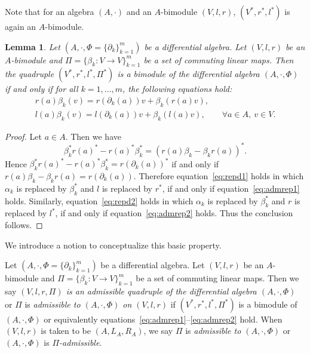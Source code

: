 \documentclass[pdftex]{sigma}
\numberwithin{equation}{section}
\newtheorem{Lemma}[Theorem]{Lemma}
\begin{document}
Note that for an algebra $(A,\cdot)$ and an $A$-bimodule $(V, l, r)$, $(V^*, r^*, l^*)$ is again an $A$-bimodule.

\begin{Lemma}\label{lem:dualrep}
 Let $(A, \cdot, \Phi = \{\partial_k\}_{k=1}^m)$ be a differential algebra.
 Let $(V, l, r)$ be an $A$-bimodule
 and $\Pi = \{\beta_k\colon V \to V\}_{k=1}^m$ be a set of commuting linear maps.
 Then the quadruple $(V^*, r^*, l^*, \Pi^*)$ is a bimodule of the differential algebra $(A, \cdot, \Phi)$ if and only if for all $k=1, \dots,
 m$, the following equations hold:
 \begin{gather}
 r(a) \beta_k(v) = r(\partial_k(a)) v + \beta_k(r(a)v), \label{eq:admrep1} \\
 l(a) \beta_k(v) = l(\partial_k(a)) v + \beta_k(l(a)v), \qquad
 \forall a \in A, \ v \in V. \label{eq:admrep2}
 \end{gather}
\end{Lemma}
\begin{proof}
	Let $a \in A$. Then we have
	\begin{equation*}
		\beta_k^* r(a)^* - r(a)^* \beta_k^* = (r(a) \beta_k - \beta_k r(a))^*.
	\end{equation*}
	Hence $\beta_k^* r(a)^* - r(a)^* \beta_k^* = r(\partial_k(a))^*$ if and only if $r(a) \beta_k - \beta_k r(a) = r(\partial_k(a))$.
	Therefore equation~\eqref{eq:repd1} holds in which $\alpha_k$ is replaced by $\beta_k^*$ and $l$ is replaced by $r^*$, if and only if equation~\eqref{eq:admrep1} holds.
	Similarly, equation~\eqref{eq:repd2} holds in which $\alpha_k$ is replaced by $\beta_k^*$ and $r$ is replaced by $l^*$, if and only if equation~\eqref{eq:admrep2} holds.
	Thus the conclusion follows.
\end{proof}


We introduce a notion to conceptualize this basic property.
\begin{Definition}\label{def:admissible}
 Let $(A, \cdot, \Phi = \{\partial_k\}_{k=1}^m)$ be a differential algebra.
 Let $(V, l, r)$ be an $A$-bimodule
 and $\Pi = \{\beta_k\colon V \to V\}_{k=1}^m$ be a set of commuting linear maps.
 Then we say \textit{$(V,l,r,\Pi)$ is an admissible quadruple of the differential algebra $(A, \cdot, \Phi)$} or
$\Pi$ is \textit{admissible to $(A, \cdot, \Phi)$ on $(V, l, r)$}
 if $(V^*, r^*, l^*, \Pi^*)$ is a bimodule of $(A, \cdot, \Phi)$ or equivalently equations~\eqref{eq:admrep1}--\eqref{eq:admrep2} hold.
 When $(V, l, r)$ is taken to be $(A, L_A, R_A)$, we say $\Pi$ is \textit{admissible to $(A, \cdot, \Phi)$} or $(A, \cdot, \Phi)$ is \textit{$\Pi$-admissible}.
\end{Definition}
\end{document}
